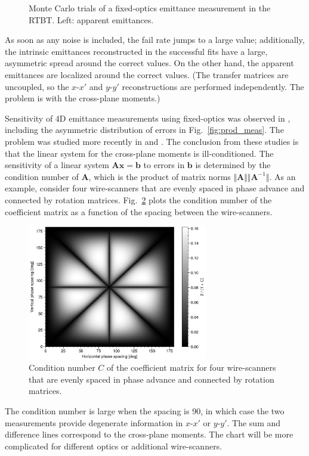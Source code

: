 \begin{figure}[!p]
\begin{subfigure}{1.0\textwidth}
    \end{subfigure}
    \caption{Monte Carlo trials of a fixed-optics emittance measurement in the RTBT. Left: apparent emittances.}
    \label{fig:prod_sensitivity}
\end{figure}
%
As soon as any noise is included, the fail rate jumps to a large value; additionally, the intrinsic emittances reconstructed in the successful fits have a large, asymmetric spread around the correct values. On the other hand, the apparent emittances are localized around the correct values. (The transfer matrices are uncoupled, so the $x$-$x'$ and $y$-$y'$ reconstructions are performed independently. The problem is with the cross-plane moments.)

Sensitivity of 4D emittance measurements using fixed-optics was observed in \cite{Woodley2000}, including the asymmetric distribution of errors in Fig.~\ref{fig:prod_meas}. The problem was studied more recently in \cite{Agapov2007} and \cite{Faus-Golfe2016}. The conclusion from these studies is that the linear system for the cross-plane moments is ill-conditioned. The sensitivity of a linear system $\mathbf{A} \mathbf{x} = \mathbf{b}$ to errors in $\mathbf{b}$ is determined by the condition number of $\mathbf{A}$, which is the product of matrix norms $\Vert \mathbf{A} \Vert \Vert \mathbf{A}^{-1} \Vert$. As an example, consider four wire-scanners that are evenly spaced in phase advance and connected by rotation matrices. Fig.~\ref{fig:fodo_condition_number} plots the condition number of the coefficient matrix as a function of the spacing between the wire-scanners.
%
\begin{figure}[!p]
    \centering
    \includegraphics[width=0.7\textwidth]{Images/chapter4/fodo_condition_number.png}
    \caption{Condition number $C$ of the coefficient matrix for four wire-scanners that are evenly spaced in phase advance and connected by rotation matrices.}
    \label{fig:fodo_condition_number}
\end{figure}
%
The condition number is large when the spacing is 90\degree, in which case the two measurements provide degenerate information in $x$-$x'$ or $y$-$y'$. The sum and difference lines correspond to the cross-plane moments. The chart will be more complicated for different optics or additional wire-scanners.

